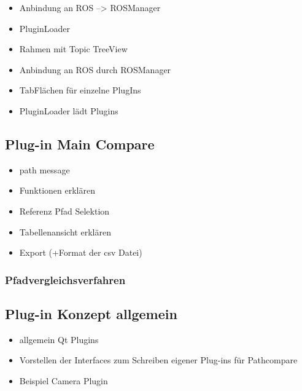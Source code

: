 \begin{itemize}
  \item Anbindung an ROS --> ROSManager
  \item PluginLoader
\end{itemize}

\begin{itemize}
  \item Rahmen mit Topic TreeView
  \item Anbindung an ROS durch ROSManager
  \item TabFlächen für einzelne PlugIns
  \item PluginLoader lädt Plugins
\end{itemize}

\subsection{Plug-in Main Compare}
\label{sub:maincompare}

\begin{itemize}
  \item path message
  \item Funktionen erklären
  \item Referenz Pfad Selektion
  \item Tabellenansicht erklären
  \item Export (+Format der csv Datei)
\end{itemize}

\subsubsection{Pfadvergleichsverfahren}



\subsection{Plug-in Konzept allgemein}
\begin{itemize}
  \item allgemein Qt Plugins
  \item Vorstellen der Interfaces zum Schreiben eigener Plug-ins für Pathcompare
  \item Beispiel Camera Plugin
\end{itemize}
